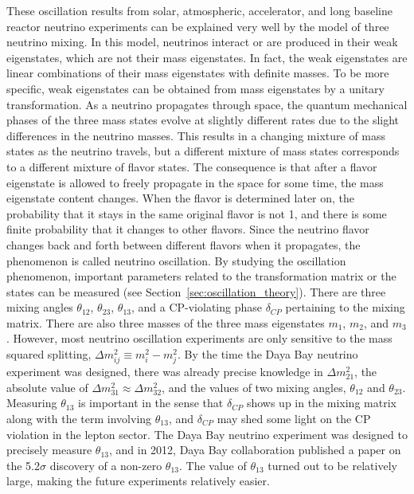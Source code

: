 These oscillation results from solar, atmospheric, accelerator, and long baseline reactor neutrino experiments can be explained very well by the model of three neutrino mixing. In this model, neutrinos interact or are produced in their weak eigenstates, which are not their mass eigenstates. In fact, the weak eigenstates are linear combinations of their mass eigenstates with definite masses. To be more specific, weak eigenstates can be obtained from mass eigenstates by a unitary transformation. As a neutrino propagates through space, the quantum mechanical phases of the three mass states evolve at slightly different rates due to the slight differences in the neutrino masses. This results in a changing mixture of mass states as the neutrino travels, but a different mixture of mass states corresponds to a different mixture of flavor states. The consequence is that after a flavor eigenstate is allowed to freely propagate in the space for some time, the mass eigenstate content changes. When the flavor is determined later on, the probability that it stays in the same original flavor is not 1, and there is some finite probability that it changes to other flavors. Since the neutrino flavor changes back and forth between different flavors when it propagates, the phenomenon is called neutrino oscillation. By studying the oscillation phenomenon, important parameters related to the transformation matrix or the states can be measured (see Section~\ref{sec:oscillation_theory}). There are three mixing angles $\theta_{12}$, $\theta_{23}$, $\theta_{13}$, and a CP-violating phase $\delta_{CP}$ pertaining to the mixing matrix. There are also three masses of the three mass eigenstates $m_1$, $m_2$, and $m_3$. However, most neutrino oscillation experiments are only sensitive to the mass squared splitting, $\Delta m_{ij}^2\equiv m_i^2-m_j^2$. By the time the Daya Bay neutrino experiment was designed, there was already precise knowledge in $\Delta m^2_{21}$, the absolute value of $\Delta m^2_{31}\approx \Delta m^2_{32}$, and the values of two mixing angles, $\theta_{12}$ and $\theta_{23}$. Measuring $\theta_{13}$ is important in the sense that $\delta_{CP}$ shows up in the mixing matrix along with the term involving $\theta_{13}$, and $\delta_{CP}$ may shed some light on the CP violation in the lepton sector. The Daya Bay neutrino experiment was designed to precisely measure $\theta_{13}$, and in 2012, Daya Bay collaboration published a paper on the 5.2$\sigma$ discovery of a non-zero $\theta_{13}$. The value of $\theta_{13}$ turned out to be relatively large, making the future experiments relatively easier.


